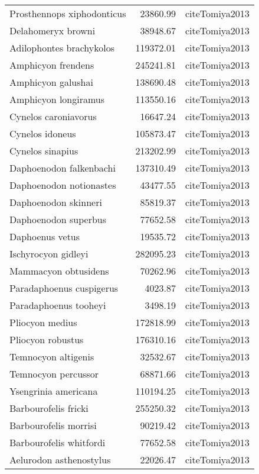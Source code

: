 \begin{table}[ht]
\begin{tabular}{lrl}
  Prosthennops xiphodonticus & 23860.99 & cite{Tomiya2013} \\ 
  Delahomeryx browni & 38948.67 & cite{Tomiya2013} \\ 
  Adilophontes brachykolos & 119372.01 & cite{Tomiya2013} \\ 
  Amphicyon frendens & 245241.81 & cite{Tomiya2013} \\ 
  Amphicyon galushai & 138690.48 & cite{Tomiya2013} \\ 
  Amphicyon longiramus & 113550.16 & cite{Tomiya2013} \\ 
  Cynelos caroniavorus & 16647.24 & cite{Tomiya2013} \\ 
  Cynelos idoneus & 105873.47 & cite{Tomiya2013} \\ 
  Cynelos sinapius & 213202.99 & cite{Tomiya2013} \\ 
  Daphoenodon falkenbachi & 137310.49 & cite{Tomiya2013} \\ 
  Daphoenodon notionastes & 43477.55 & cite{Tomiya2013} \\ 
  Daphoenodon skinneri & 85819.37 & cite{Tomiya2013} \\ 
  Daphoenodon superbus & 77652.58 & cite{Tomiya2013} \\ 
  Daphoenus vetus & 19535.72 & cite{Tomiya2013} \\ 
  Ischyrocyon gidleyi & 282095.23 & cite{Tomiya2013} \\ 
  Mammacyon obtusidens & 70262.96 & cite{Tomiya2013} \\ 
  Paradaphoenus cuspigerus & 4023.87 & cite{Tomiya2013} \\ 
  Paradaphoenus tooheyi & 3498.19 & cite{Tomiya2013} \\ 
  Pliocyon medius & 172818.99 & cite{Tomiya2013} \\ 
  Pliocyon robustus & 176310.16 & cite{Tomiya2013} \\ 
  Temnocyon altigenis & 32532.67 & cite{Tomiya2013} \\ 
  Temnocyon percussor & 68871.66 & cite{Tomiya2013} \\ 
  Ysengrinia americana & 110194.25 & cite{Tomiya2013} \\ 
  Barbourofelis fricki & 255250.32 & cite{Tomiya2013} \\ 
  Barbourofelis morrisi & 90219.42 & cite{Tomiya2013} \\ 
  Barbourofelis whitfordi & 77652.58 & cite{Tomiya2013} \\ 
  Aelurodon asthenostylus & 22026.47 & cite{Tomiya2013} \\ 

\end{tabular}
\end{table}
